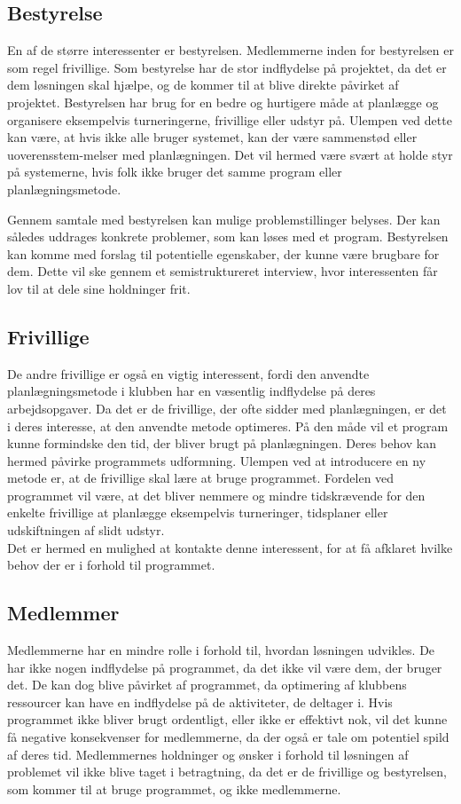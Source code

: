 \subsection*{Bestyrelse}
En af de større interessenter er bestyrelsen. Medlemmerne inden for bestyrelsen er som regel frivillige. Som bestyrelse har de stor indflydelse på projektet, da det er dem løsningen skal hjælpe, og de kommer til at blive direkte påvirket af projektet. Bestyrelsen har brug for en bedre og hurtigere måde at planlægge og organisere eksempelvis turneringerne, frivillige eller udstyr på. Ulempen ved dette kan være, at hvis ikke alle bruger systemet, kan der være sammenstød eller uoverensstem-melser med planlægningen. Det vil hermed være svært at holde styr på systemerne, hvis folk ikke bruger det samme program eller planlægningsmetode.
\par 
Gennem samtale med bestyrelsen kan mulige problemstillinger belyses. Der kan således uddrages konkrete problemer, som kan løses med et program. Bestyrelsen kan komme med forslag til potentielle egenskaber, der kunne være brugbare for dem. Dette vil ske gennem et semistruktureret interview, hvor interessenten får lov til at dele sine holdninger frit.

\subsection*{Frivillige}
De andre frivillige er også en vigtig interessent, fordi den anvendte planlægningsmetode i klubben har en væsentlig indflydelse på deres arbejdsopgaver. Da det er de frivillige, der ofte sidder med planlægningen, er det i deres interesse, at den anvendte metode optimeres. På den måde vil et program kunne formindske den tid, der bliver brugt på planlægningen. Deres behov kan hermed påvirke programmets udformning. Ulempen ved at introducere en ny metode er, at de frivillige skal lære at bruge programmet. Fordelen ved programmet vil være, at det bliver nemmere og mindre tidskrævende for den enkelte frivillige at planlægge eksempelvis turneringer, tidsplaner eller udskiftningen af slidt udstyr.\\
Det er hermed en mulighed at kontakte denne interessent, for at få afklaret hvilke behov der er i forhold til programmet.

\subsection*{Medlemmer}
Medlemmerne har en mindre rolle i forhold til, hvordan løsningen udvikles. De har ikke nogen indflydelse på programmet, da det ikke vil være dem, der bruger det. De kan dog blive påvirket af programmet, da optimering af klubbens ressourcer kan have en indflydelse på de aktiviteter, de deltager i. Hvis programmet ikke bliver brugt ordentligt, eller ikke er effektivt nok, vil det kunne få negative konsekvenser for medlemmerne, da der også er tale om potentiel spild af deres tid. Medlemmernes holdninger og ønsker i forhold til løsningen af problemet vil ikke blive taget i betragtning, da det er de frivillige og bestyrelsen, som kommer til at bruge programmet, og ikke medlemmerne.

